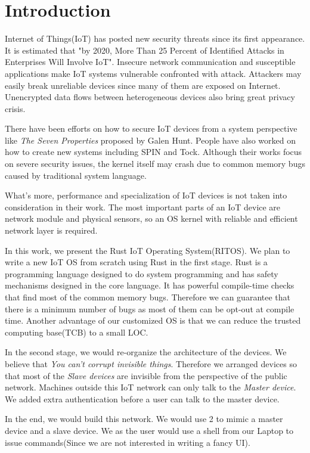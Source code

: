 \section{Introduction}

Internet of Things(IoT) has posted new security threats since its first appearance. It is estimated that "by 2020, More Than 25 Percent of Identified Attacks in Enterprises Will Involve IoT"\cite{gartner2016gartner}. Insecure network communication and susceptible applications make IoT systems vulnerable confronted with attack. Attackers may easily break unreliable devices since many of them are exposed on Internet\cite{kolias2017ddos}. Unencrypted data flows between heterogeneous devices also bring great privacy crisis\cite{khan2018iot}.


There have been efforts on how to secure IoT devices from a system perspective like \textit{The Seven Properties}\cite{hunt2017the} proposed by Galen Hunt. People have also worked on how to create new systems including SPIN\cite{hesselman2017spin} and Tock\cite{levy2017tock}. Although their works focus on severe security issues, the kernel itself may crash due to common memory bugs caused by traditional system language.

What's more, performance and specialization of IoT devices is not taken into consideration in their work. The most important parts of an IoT device are network module and physical sensors, so an OS kernel with reliable and efficient network layer is required.



In this work, we present the Rust IoT Operating System(RITOS).
We plan to write a new IoT OS from scratch using Rust in the first stage.
Rust is a programming language designed to do system programming and has safety mechanisms designed in the core language.
It has powerful compile-time checks that find most of the common memory bugs.
Therefore we can guarantee that there is a minimum number of bugs as most of them can be opt-out at compile time. 
Another advantage of our customized OS is that we can reduce the trusted computing base(TCB) to a small LOC.

In the second stage, we would re-organize the architecture of the devices.
We believe that \textit{You can't corrupt invisible things}.
Therefore we arranged devices so that most of the \textit{Slave devices} are invisible from the perspective of the public network.
Machines outside this IoT network can only talk to the \textit{Master device}.
We added extra authentication before a user can talk to the master device.


In the end, we would build this network. 
We would use 2 \rpi to mimic a master device and a slave device. 
We as the user would use a shell from our Laptop to issue commands(Since we are not interested in writing a fancy UI).